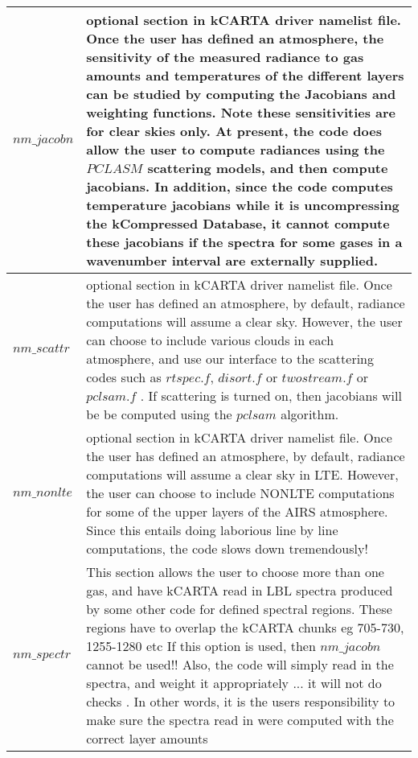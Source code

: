 \documentclass[12pt]{article}
\newcommand{\kc}{\textsf{kCARTA}\xspace}
\newlength{\colwidth}
\begin{document}
\begin{longtable}{|l|p{\colwidth}|}
$nm\_jacobn$ & optional section in \kc driver namelist file.  Once the user 
              has defined an atmosphere, the sensitivity of the measured 
              radiance to gas amounts and temperatures of the different 
              layers can be 
              studied by computing the Jacobians and weighting functions. Note
              these sensitivities are for clear skies only. At present, the 
              code does allow the user to compute radiances using the $PCLASM$
              scattering models, and then compute jacobians.
              In addition, since the code computes temperature jacobians while
              it is uncompressing the kCompressed Database, it cannot compute
              these jacobians if the spectra for some gases in a wavenumber
              interval are externally supplied.\\ \hline
$nm\_scattr$ & optional section in \kc driver namelist file.  Once the user 
               has defined an atmosphere, by default, radiance computations 
               will assume a clear sky.  However, the user can choose to 
               include various clouds in each atmosphere, and use our 
               interface to the scattering codes such as $rtspec.f$, 
               $disort.f$ or $twostream.f$ or $pclsam.f$ . If scattering is 
               turned on, then jacobians will be be computed using the 
               $pclsam$ algorithm.\\ \hline
$nm\_nonlte$ & optional section in \kc driver namelist file.  Once the user 
               has defined an atmosphere, by default, radiance computations 
               will assume a clear sky in LTE.  However, the user can choose 
               to include NONLTE computations for some of the upper layers of
               the AIRS atmosphere. Since this entails doing laborious line by
               line computations, the code slows down tremendously!\\ \hline
$nm\_spectr$ & This section allows the user to choose more than one gas, and 
              have  kCARTA read in LBL spectra produced by some other code
                for defined spectral regions. These regions have to overlap 
                the kCARTA chunks eg 705-730, 1255-1280 etc
                If this option is used, then $nm\_jacobn$ cannot be used!!
                Also, the code will simply read in the spectra, and weight it
                appropriately ... it will not do checks . In other
                words, it is the users responsibility to make sure the
                spectra read in were computed with the correct layer amounts

\end{longtable}
\end{document}
